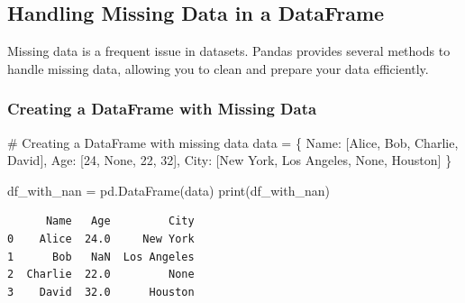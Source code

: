 \documentclass[
  letterpaper,
  DIV=11,
  numbers=noendperiod]{scrreprt}
\newenvironment{Shaded}{\begin{snugshade}}{\end{snugshade}}
\newcommand{\BuiltInTok}[1]{\textcolor[rgb]{0.00,0.23,0.31}{#1}}
\newcommand{\CommentTok}[1]{\textcolor[rgb]{0.37,0.37,0.37}{#1}}
\newcommand{\DecValTok}[1]{\textcolor[rgb]{0.68,0.00,0.00}{#1}}
\newcommand{\NormalTok}[1]{\textcolor[rgb]{0.00,0.23,0.31}{#1}}
\newcommand{\OperatorTok}[1]{\textcolor[rgb]{0.37,0.37,0.37}{#1}}
\newcommand{\StringTok}[1]{\textcolor[rgb]{0.13,0.47,0.30}{#1}}
\newcommand{\VariableTok}[1]{\textcolor[rgb]{0.07,0.07,0.07}{#1}}
\begin{document}
\hypertarget{handling-missing-data-in-a-dataframe}{%
\subsection{Handling Missing Data in a
DataFrame}\label{handling-missing-data-in-a-dataframe}}

Missing data is a frequent issue in datasets. Pandas provides several
methods to handle missing data, allowing you to clean and prepare your
data efficiently.

\hypertarget{creating-a-dataframe-with-missing-data}{%
\subsubsection{Creating a DataFrame with Missing
Data}\label{creating-a-dataframe-with-missing-data}}

\begin{Shaded}
\begin{Highlighting}[]
\CommentTok{\# Creating a DataFrame with missing data}
\NormalTok{data }\OperatorTok{=}\NormalTok{ \{}
    \StringTok{\textquotesingle{}Name\textquotesingle{}}\NormalTok{: [}\StringTok{\textquotesingle{}Alice\textquotesingle{}}\NormalTok{, }\StringTok{\textquotesingle{}Bob\textquotesingle{}}\NormalTok{, }\StringTok{\textquotesingle{}Charlie\textquotesingle{}}\NormalTok{, }\StringTok{\textquotesingle{}David\textquotesingle{}}\NormalTok{],}
    \StringTok{\textquotesingle{}Age\textquotesingle{}}\NormalTok{: [}\DecValTok{24}\NormalTok{, }\VariableTok{None}\NormalTok{, }\DecValTok{22}\NormalTok{, }\DecValTok{32}\NormalTok{],}
    \StringTok{\textquotesingle{}City\textquotesingle{}}\NormalTok{: [}\StringTok{\textquotesingle{}New York\textquotesingle{}}\NormalTok{, }\StringTok{\textquotesingle{}Los Angeles\textquotesingle{}}\NormalTok{, }\VariableTok{None}\NormalTok{, }\StringTok{\textquotesingle{}Houston\textquotesingle{}}\NormalTok{]}
\NormalTok{\}}

\NormalTok{df\_with\_nan }\OperatorTok{=}\NormalTok{ pd.DataFrame(data)}
\BuiltInTok{print}\NormalTok{(df\_with\_nan)}
\end{Highlighting}
\end{Shaded}

\begin{verbatim}
      Name   Age         City
0    Alice  24.0     New York
1      Bob   NaN  Los Angeles
2  Charlie  22.0         None
3    David  32.0      Houston
\end{verbatim}
\end{document}
